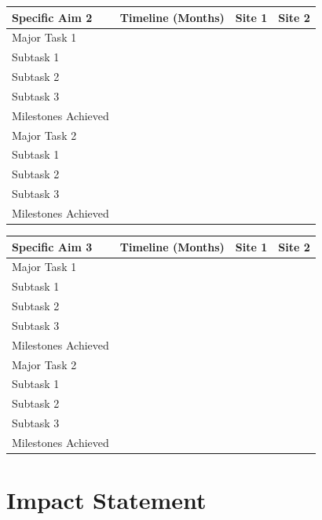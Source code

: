\documentclass[onecolumn, compsoc,12pt]{IEEEtran}
\begin{document}
\begin{center}

\begin{tabular}{|L{3.5in}|C{.75in}|C{.5in}|C{.5in}|}\hline
\bf Specific Aim 2 & \bf Timeline (Months)  & \bf Site 1 & \bf Site 2 \\\hline
{} Major Task 1 &  & & \\\hline
Subtask 1 &  & & \\\hline
Subtask 2 &  & & \\\hline
  Subtask 3 &  & & \\\hline
  Milestones Achieved & & & \\\hline
  Major Task 2 & & & \\\hline
Subtask 1 &  & & \\\hline
Subtask 2 &  & & \\\hline
  Subtask 3 &  & & \\\hline
  Milestones Achieved & & & \\\hline 
\end{tabular}
\end{center}



\begin{center}

\begin{tabular}{|L{3.5in}|C{.75in}|C{.5in}|C{.5in}|}\hline
\bf Specific Aim 3 & \bf Timeline (Months)  & \bf Site 1 & \bf Site 2 \\\hline
{} Major Task 1 &  & & \\\hline
Subtask 1 &  & & \\\hline
Subtask 2 &  & & \\\hline
  Subtask 3 &  & & \\\hline
  Milestones Achieved & & & \\\hline
  Major Task 2 & & & \\\hline
Subtask 1 &  & & \\\hline
Subtask 2 &  & & \\\hline
  Subtask 3 &  & & \\\hline
  Milestones Achieved & & & \\\hline 
\end{tabular}
\end{center}





\clearpage
{}
\section*{Impact Statement}
\end{document}
